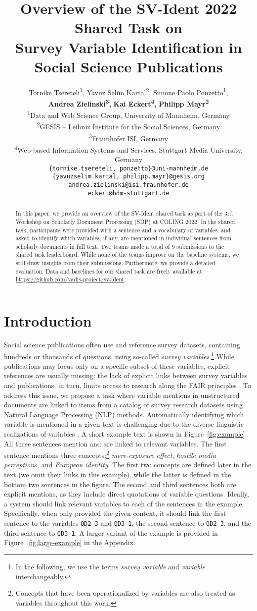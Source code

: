 \documentclass[11pt]{article}
\title{Overview of the SV-Ident 2022 Shared Task on \\
Survey Variable Identification in Social Science Publications}
\author{Tornike Tsereteli\textsuperscript{1}, Yavuz Selim Kartal\textsuperscript{2}, Simone Paolo Ponzetto\textsuperscript{1},\\\textbf{Andrea Zielinski\textsuperscript{3}}\textbf{,} \textbf{Kai Eckert\textsuperscript{4}}\textbf{,} \textbf{Philipp Mayr\textsuperscript{2}} \\\textsuperscript{1}Data and Web Science Group, University of Mannheim, Germany \\
  \textsuperscript{2}GESIS -- Leibniz Institute for the Social Sciences, Germany \\\textsuperscript{3}Fraunhofer ISI, Germany \\ 
  \textsuperscript{4}Web-based Information Systems and Services, Stuttgart Media University, Germany\\
  \texttt{\{tornike.tsereteli, ponzetto\}@uni-mannheim.de} \\ \texttt{\{yavuzselim.kartal, philipp.mayr\}@gesis.org} \\
  \texttt{andrea.zielinski@isi.fraunhofer.de} \\
  \texttt{eckert@hdm-stuttgart.de}}
\begin{document}
\maketitle


\begin{abstract}
In this paper, we provide an overview of the SV-Ident shared task as part of the 3rd Workshop on Scholarly Document Processing (SDP) at COLING 2022.
In the shared task, participants were provided with a sentence and a vocabulary of variables, and asked to identify which variables, if any, are mentioned in individual sentences from scholarly documents in full text.
Two teams made a total of 9 submissions to the shared task leaderboard.
While none of the teams improve on the baseline systems, we still draw insights from their submissions.
Furthermore, we provide a detailed evaluation.
Data and baselines for our shared task are freely available at \url{https://github.com/vadis-project/sv-ident}.
\end{abstract}


\section{Introduction}
\label{sec:introduction}
Social science publications often use and reference survey datasets, containing hundreds or thousands of questions, using so-called \textit{survey variables}.\footnote{In the following, we use the terms \textit{survey variable} and \textit{variable} interchangeably.}
While publications may focus only on a specific subset of these variables, explicit references are usually missing: the lack of explicit links between survey variables and publications, in turn, limits access to research along the FAIR principles \citep{Wilkinson2016}.
To address this issue, we propose a task where variable mentions in unstructured documents are linked to items from a catalog of survey research datasets using Natural Language Processing (NLP) methods.
Automatically identifying which variable is mentioned in a given text is challenging due to the diverse linguistic realizations of variables \cite{zielinski-mutschke-2018-towards}.
A short example text is shown in Figure~\ref{fig:example}.
All three sentences mention and are linked to relevant variables.
The first sentence mentions three concepts:\footnote{Concepts that have been operationalized by variables are also treated as variables throughout this work.} \textit{mere-exposure effect}, \textit{hostile media perceptions}, and \textit{European identity}.
The first two concepts are defined later in the text (we omit their links in this example), while the latter is defined in the bottom two sentences in the figure.
The second and third sentences both are explicit mentions, as they include direct quotations of variable questions.
Ideally, a system should link relevant variables to each of the sentences in the example.
Specifically, when only provided the given context, it should link the first sentence to the variables \texttt{QD2\_3} and \texttt{QD3\_1}, the second sentence to \texttt{QD2\_3}, and the third sentence to \texttt{QD3\_1}.
A larger variant of the example is provided in Figure~\ref{fig:large-example} in the Appendix.
\end{document}
